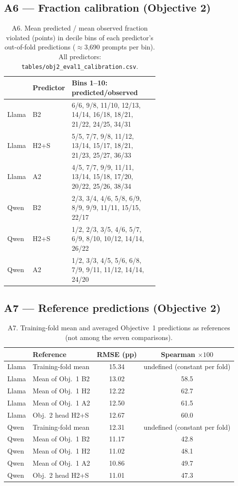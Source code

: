 \documentclass{article}
\begin{document}
\subsection*{A6 --- Fraction calibration (Objective 2)}
\begin{table}[h]
\centering\scriptsize
\caption{A6. Mean predicted / mean observed fraction violated (points) in decile bins of each predictor's out-of-fold predictions ($\approx$3,690 prompts per bin). All predictors: \texttt{tables/obj2\_eval1\_calibration.csv}.}
\label{tab:A6}
\begin{tabular}{llp{0.62\linewidth}}
\toprule
 & Predictor & Bins 1--10: predicted/observed \\
\midrule
Llama & B2 & 6/6, 9/8, 11/10, 12/13, 14/14, 16/18, 18/21, 21/22, 24/25, 34/31 \\
Llama & H2+S & 5/5, 7/7, 9/8, 11/12, 13/14, 15/17, 18/21, 21/23, 25/27, 36/33 \\
Llama & A2 & 4/5, 7/7, 9/9, 11/11, 13/14, 15/18, 17/20, 20/22, 25/26, 38/34 \\
Qwen & B2 & 2/3, 3/4, 4/6, 5/8, 6/9, 8/9, 9/9, 11/11, 15/15, 22/17 \\
Qwen & H2+S & 1/2, 2/3, 3/5, 4/6, 5/7, 6/9, 8/10, 10/12, 14/14, 26/22 \\
Qwen & A2 & 1/2, 3/3, 4/5, 5/6, 6/8, 7/9, 9/11, 11/12, 14/14, 24/20 \\
\bottomrule
\end{tabular}
\end{table}

\subsection*{A7 --- Reference predictions (Objective 2)}
\begin{table}[h]
\centering\scriptsize
\caption{A7. Training-fold mean and averaged Objective~1 predictions as references (not among the seven comparisons).}
\label{tab:A7}
\begin{tabular}{llcc}
\toprule
 & Reference & RMSE (pp) & Spearman $\times100$ \\
\midrule
Llama & Training-fold mean & 15.34 & undefined (constant per fold) \\
Llama & Mean of Obj.~1 B2 & 13.02 & 58.5 \\
Llama & Mean of Obj.~1 H2 & 12.22 & 62.7 \\
Llama & Mean of Obj.~1 A2 & 12.50 & 61.5 \\
Llama & Obj.~2 head H2+S & 12.67 & 60.0 \\
\midrule
Qwen & Training-fold mean & 12.31 & undefined (constant per fold) \\
Qwen & Mean of Obj.~1 B2 & 11.17 & 42.8 \\
Qwen & Mean of Obj.~1 H2 & 11.02 & 48.1 \\
Qwen & Mean of Obj.~1 A2 & 10.86 & 49.7 \\
Qwen & Obj.~2 head H2+S & 11.01 & 47.3 \\
\bottomrule
\end{tabular}
\end{table}
\end{document}
